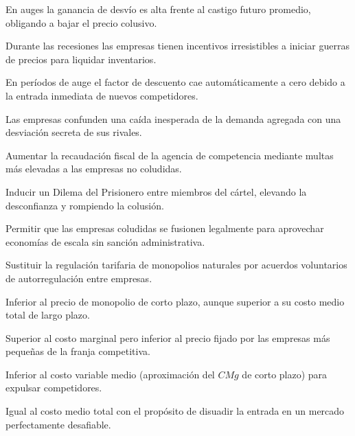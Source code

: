 \begin{opts}
    \item En auges la ganancia de desvío es alta frente al castigo futuro promedio, obligando a bajar el precio colusivo.
    \item Durante las recesiones las empresas tienen incentivos irresistibles a iniciar guerras de precios para liquidar inventarios.
    \item En períodos de auge el factor de descuento cae automáticamente a cero debido a la entrada inmediata de nuevos competidores.
    \item Las empresas confunden una caída inesperada de la demanda agregada con una desviación secreta de sus rivales.
\end{opts}

\begin{opts}
    \item Aumentar la recaudación fiscal de la agencia de competencia mediante multas más elevadas a las empresas no coludidas.
    \item Inducir un Dilema del Prisionero entre miembros del cártel, elevando la desconfianza y rompiendo la colusión.
    \item Permitir que las empresas coludidas se fusionen legalmente para aprovechar economías de escala sin sanción administrativa.
    \item Sustituir la regulación tarifaria de monopolios naturales por acuerdos voluntarios de autorregulación entre empresas.
\end{opts}

\begin{opts}
    \item Inferior al precio de monopolio de corto plazo, aunque superior a su costo medio total de largo plazo.
    \item Superior al costo marginal pero inferior al precio fijado por las empresas más pequeñas de la franja competitiva.
    \item Inferior al costo variable medio (aproximación del $CMg$ de corto plazo) para expulsar competidores.
    \item Igual al costo medio total con el propósito de disuadir la entrada en un mercado perfectamente desafiable.
\end{opts}

